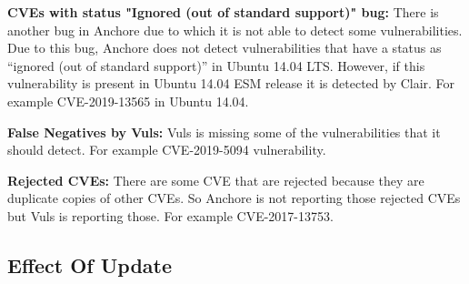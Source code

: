 \documentclass[a4paper,num-refs]{oup-contemporary}
\begin{document}
\textbf{CVEs with status "Ignored (out of standard support)" bug:} There is another bug in Anchore due to 
		which it is not able to detect some vulnerabilities. Due to this bug, Anchore does not detect 
		vulnerabilities that have a status as “ignored (out of standard support)” in Ubuntu 14.04 LTS. 
		However, if this vulnerability is present in Ubuntu 14.04 ESM release it is detected by Clair. 
		For example CVE-2019-13565 in Ubuntu 14.04.


\textbf{False Negatives by Vuls:} Vuls is missing some of the vulnerabilities that it should detect. 
		For example CVE-2019-5094 vulnerability.

\textbf{Rejected CVEs:} There are some CVE that are rejected because they are duplicate copies of other CVEs. 
	So Anchore is not reporting those rejected CVEs but Vuls is reporting those. For example CVE-2017-13753.
\subsection{Effect Of Update}
\end{document}
